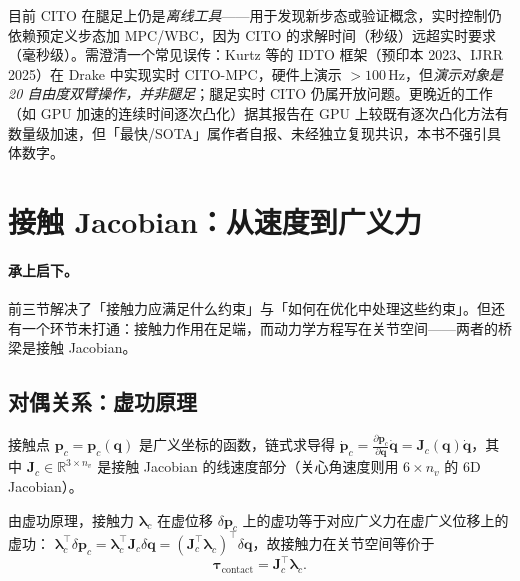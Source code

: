 \begin{pitfall}
目前 CITO 在腿足上仍是\emph{离线工具}——用于发现新步态或验证概念，实时控制仍依赖预定义步态加 MPC/WBC，因为 CITO 的求解时间（秒级）远超实时要求（毫秒级）。需澄清一个常见误传：Kurtz 等的 IDTO 框架（预印本 2023、IJRR 2025）在 Drake 中实现实时 CITO-MPC，硬件上演示 $>100\,$Hz，但\emph{演示对象是 20 自由度双臂操作，并非腿足}；腿足实时 CITO 仍属开放问题。更晚近的工作（如 GPU 加速的连续时间逐次凸化）据其报告在 GPU 上较既有逐次凸化方法有数量级加速，但「最快/SOTA」属作者自报、未经独立复现共识，本书不强引具体数字。
\end{pitfall}

\section{接触 Jacobian：从速度到广义力}
\label{sec:contact-jacobian}

\paragraph{承上启下。}
前三节解决了「接触力应满足什么约束」与「如何在优化中处理这些约束」。但还有一个环节未打通：接触力作用在足端，而动力学方程写在关节空间——两者的桥梁是接触 Jacobian。

\subsection{对偶关系：虚功原理}
\label{subsec:jacobian-duality}

接触点 $\boldsymbol{p}_c=\boldsymbol{p}_c(\boldsymbol{q})$ 是广义坐标的函数，链式求导得 $\dot{\boldsymbol{p}}_c=\tfrac{\partial\boldsymbol{p}_c}{\partial\boldsymbol{q}}\dot{\boldsymbol{q}}=\mathbf{J}_c(\boldsymbol{q})\dot{\boldsymbol{q}}$，其中 $\mathbf{J}_c\in\mathbb{R}^{3\times n_v}$ 是接触 Jacobian 的线速度部分（关心角速度则用 $6\times n_v$ 的 6D Jacobian）。

\begin{theorem}[接触力的对偶映射]
\label{thm:jacobian-dual}
由虚功原理，接触力 $\boldsymbol{\lambda}_c$ 在虚位移 $\delta\boldsymbol{p}_c$ 上的虚功等于对应广义力在虚广义位移上的虚功：
$\boldsymbol{\lambda}_c^\top\delta\boldsymbol{p}_c=\boldsymbol{\lambda}_c^\top\mathbf{J}_c\delta\boldsymbol{q}=(\mathbf{J}_c^\top\boldsymbol{\lambda}_c)^\top\delta\boldsymbol{q}$，故接触力在关节空间等价于
\begin{equation}
  \boldsymbol{\tau}_{\mathrm{contact}}=\mathbf{J}_c^\top\boldsymbol{\lambda}_c.
  \label{eq:jacobian-transpose}
\end{equation}
\end{theorem}

